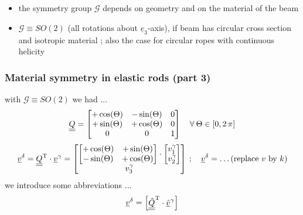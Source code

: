 \begin{frame}
  \vspace{0.5em}
  \begin{itemize}
    \item the symmetry group $\mathscr{G}$ depends on geometry and on the material of the beam
    \item $\mathscr{G} \equiv SO(2)$ (all rotations about $\underline{e}_3$-axis), if beam has circular cross section and isotropic material ; also the case for circular ropes with continuous helicity
  \end{itemize}
  
\end{frame}


\begin{frame}
  \frametitle{Material symmetry in elastic rods (part 3)}
  \vspace{-0.4em}
  with $\mathscr{G} \equiv SO(2)$ we had ...
  \begin{displaymath}
    \underline{\underline{Q}} =
    \begin{bmatrix}
      +\cos(\Theta) & -\sin(\Theta) & 0 \\
      +\sin(\Theta) & +\cos(\Theta) & 0 \\
      0 & 0 & 1
    \end{bmatrix}
    \quad \forall \: \Theta \in [0,2\,\pi]
  \end{displaymath}
  \begin{displaymath}
    \underline{v}^{\delta} =
    \underline{\underline{Q}}^{\mathrm{T}} \cdot \underline{v}^{\gamma} =
    \begin{bmatrix}
      \begin{bmatrix}
        +\cos(\Theta) & +\sin(\Theta) \\
        -\sin(\Theta) & +\cos(\Theta)
      \end{bmatrix} \cdot
      \begin{bmatrix}
        v_1^{\gamma} \\ v_2^{\gamma}
      \end{bmatrix} \\
      v_3^{\gamma}
    \end{bmatrix}
    \: ; \quad
    \underline{v}^{\delta} = \dots \text{(replace }v\text{ by }k\text{)}
  \end{displaymath}
  we introduce some abbreviations ...
  \begin{displaymath}
    \underline{v}^{\delta} =
    \begin{bmatrix}
      \underline{\underline{\hat{Q}}}^{\mathrm{T}} \cdot \underline{\hat{v}}^{\gamma} \\

\end{bmatrix}
\end{displaymath}
\end{frame}
